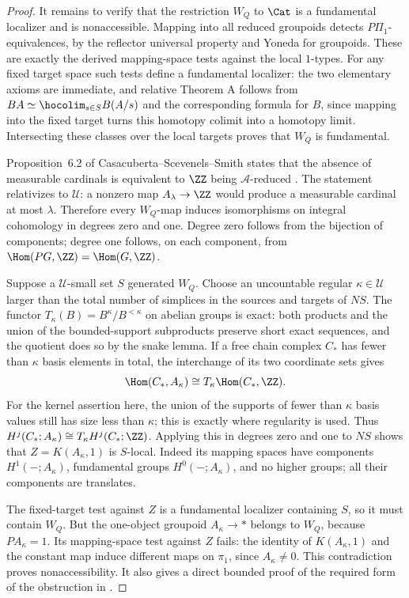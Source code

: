 \begin{proof}
It remains to verify that the restriction $W_Q$ to $\Cat$ is
a fundamental localizer and is nonaccessible. Mapping into all
reduced groupoids detects $P\Pi_1$-equivalences, by the reflector
universal property and Yoneda for groupoids. These are exactly
the derived mapping-space tests against the local $1$-types.
For any fixed target space such tests define a fundamental
localizer: the two elementary axioms are immediate, and relative
Theorem A follows from
$BA\simeq\hocolim_{s\in S}B(A/s)$ and the corresponding
formula for $B$, since mapping into the fixed target turns this
homotopy colimit into a homotopy limit. Intersecting these classes
over the local targets proves that $W_Q$ is fundamental.

Proposition~6.2 of Casacuberta--Scevenels--Smith states that the
absence of measurable cardinals is equivalent to $\ZZ$ being
$\mathcal A$-reduced \cite{I_CSS2005}. The statement relativizes
to $\mathcal U$: a nonzero map $A_\lambda\to\ZZ$ would produce
a measurable cardinal at most $\lambda$. Therefore every
$W_Q$-map induces isomorphisms on integral cohomology in degrees
zero and one. Degree zero follows from the bijection of
components; degree one follows, on each component, from
$\Hom(PG,\ZZ)=\Hom(G,\ZZ)$.

Suppose a $\mathcal U$-small set $S$ generated $W_Q$. Choose
an uncountable regular $\kappa\in\mathcal U$ larger than the
total number of simplices in the sources and targets of $NS$.
The functor $T_\kappa(B)=B^\kappa/B^{<\kappa}$ on abelian
groups is exact: both products and the union of the bounded-support
subproducts preserve short exact sequences, and the quotient
does so by the snake lemma. If a free chain complex $C_*$ has
fewer than $\kappa$ basis elements in total, the interchange of
its two coordinate sets gives
\[
 \Hom(C_*,A_\kappa)
       \cong T_\kappa\Hom(C_*,\ZZ).
\]
For the kernel assertion here, the union of the supports of
fewer than $\kappa$ basis values still has size less than
$\kappa$; this is exactly where regularity is used. Thus
$H^j(C_*;A_\kappa)\cong T_\kappa H^j(C_*;\ZZ)$.
Applying this in degrees zero and one to $NS$ shows that
$Z=K(A_\kappa,1)$ is $S$-local. Indeed its mapping spaces have
components $H^1(-;A_\kappa)$, fundamental groups
$H^0(-;A_\kappa)$, and no higher groups; all their components
are translates.

The fixed-target test against $Z$ is a fundamental localizer
containing $S$, so it must contain $W_Q$. But the one-object
groupoid $A_\kappa\to *$ belongs to $W_Q$, because
$P A_\kappa=1$. Its mapping-space test against $Z$ fails:
the identity of $K(A_\kappa,1)$ and the constant map induce
different maps on $\pi_1$, since $A_\kappa\ne0$. This
contradiction proves nonaccessibility. It also gives a direct
bounded proof of the required form of the obstruction in
\cite[Theorems~6.3--6.4]{I_CSS2005}.


\end{proof}
